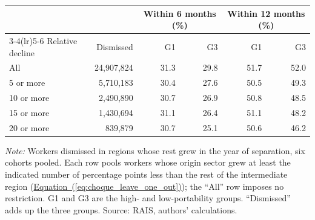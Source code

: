 {\footnotesize
\begin{threeparttable}
\begin{tabular}{lrrrrr}
\toprule
 & & \multicolumn{2}{c}{Within 6 months (\%)} & \multicolumn{2}{c}{Within 12 months (\%)} \\
\cmidrule(lr){3-4}\cmidrule(lr){5-6}
Relative decline & Dismissed & G1 & G3 & G1 & G3 \\
\midrule
All & 24,907,824 & 31.3 & 29.8 & 51.7 & 52.0 \\
5 or more & 5,710,183 & 30.4 & 27.6 & 50.5 & 49.3 \\
10 or more & 2,490,890 & 30.7 & 26.9 & 50.8 & 48.5 \\
15 or more & 1,430,694 & 31.1 & 26.4 & 51.1 & 48.2 \\
20 or more & 839,879 & 30.7 & 25.1 & 50.6 & 46.2 \\
\bottomrule
\end{tabular}
\begin{tablenotes}[flushleft]\footnotesize
\item \textit{Note:} Workers dismissed in regions whose rest grew in the year of separation, six cohorts pooled. Each row pools workers whose origin sector grew at least the indicated number of percentage points less than the rest of the intermediate region (\hyperref[eq:choque_leave_one_out]{Equation~(\ref*{eq:choque_leave_one_out})}); the ``All'' row imposes no restriction. G1 and G3 are the high- and low-portability groups. ``Dismissed'' adds up the three groups. Source: RAIS, authors' calculations.
\end{tablenotes}
\end{threeparttable}
}
